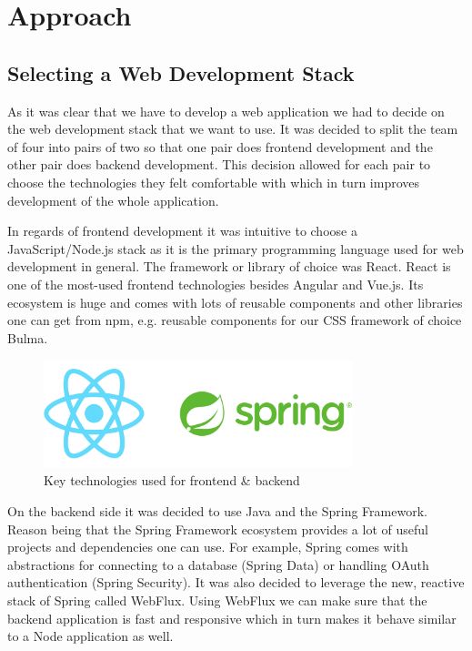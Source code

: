 \chapter{Approach}
\label{ch:Approach}

\section{Selecting a Web Development Stack}

As it was clear that we have to develop a web application we had to decide on the web development stack that we want to use. It was decided to split the team of four into pairs of two so that one pair does frontend development and the other pair does backend development. This decision allowed for each pair to choose the technologies they felt comfortable with which in turn improves development of the whole application.

In regards of frontend development it was intuitive to choose a JavaScript/Node.js stack as it is the primary programming language used for web development in general. The framework or library of choice was React. React is one of the most-used frontend technologies besides Angular and Vue.js. Its ecosystem is huge and comes with lots of reusable components and other libraries one can get from npm, e.g. reusable components for our \acs{CSS} framework of choice Bulma.

\begin{figure}[bth]
    \centering
    \includegraphics[width=0.8\textwidth]{Graphics/Chapter2/frontend-backend-stack.png}
    \caption{Key technologies used for frontend \& backend}
\end{figure}

On the backend side it was decided to use Java and the Spring Framework. Reason being that the Spring Framework ecosystem provides a lot of useful projects and dependencies one can use. For example, Spring comes with abstractions for connecting to a database (Spring Data) or handling OAuth authentication (Spring Security). It was also decided to leverage the new, reactive stack of Spring called WebFlux. Using WebFlux we can make sure that the backend application is fast and responsive which in turn makes it behave similar to a Node application as well.

